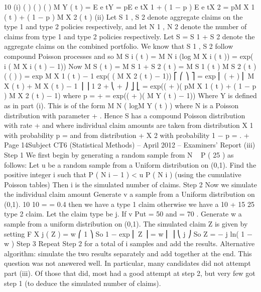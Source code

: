 \documentclass[a4paper,12pt]{article}
\begin{document}
10
(i)
( )
( )
( )
M Y ( t ) = E e tY = pE e tX 1 + ( 1 − p ) E e tX 2
= pM X 1 ( t ) + ( 1 − p ) M X 2 ( t )
(ii)
Let S 1 , S 2 denote aggregate claims on the type 1 and type 2 policies
respectively, and let N 1 , N 2 denote the number of claims from type 1 and type
2 policies respectively. Let S = S 1 + S 2 denote the aggregate claims on the
combined portfolio. We know that S 1 , S 2 follow compound Poisson processes
and so
M S i ( t ) = M N i (log M X i ( t )) = exp( \lambda  i ( M X i ( t ) − 1))
Now
M S ( t ) = M S 1 + S 2 ( t ) = M S 1 ( t ) M S 2 ( t )
( (
) )
= exp  M X 1 ( t ) − 1 exp(  ( M X 2 ( t ) − 1))
⎡
⎛ 
⎞ ⎤
= exp ⎢ (  +  ) ⎜
M X ( t ) +
M X ( t ) − 1 ⎟ ⎥
1
2
 + 
⎝  + 
⎠ ⎦
⎣
= exp((  +  )( pM X 1 ( t ) + ( 1 − p ) M X 2 ( t ) − 1) where p =
 + 
= exp((  +  )( M Y ( t ) − 1))
Where Y is defined as in part (i). This is of the form M N ( logM Y ( t ) ) where N
is a Poisson distribution with parameter  +  . Hence S has a compound
Poisson distribution with rate  +  and where individual claim amounts are
taken from distribution X 1 with probability p =
and from distribution
 + 
X 2 with probability 1 − p =
.
 + 
Page 14Subject CT6 (Statistical Methods) – April 2012 – Examiners’ Report
(iii)
Step 1
We first begin by generating a random sample from N ~ P ( 25 ) as follows:
Let u be a random sample from a Uniform distribution on (0,1).
Find the positive integer i such that P ( N \leq  i − 1 ) < u \leq  P ( N \leq  i ) (using the
cumulative Poisson tables)
Then i is the simulated number of claims.
Step 2
Now we simulate the individual claim amount
Generate v a sample from a Uniform distribution on (0,1).
10
10
=
= 0.4 then we have a type 1 claim otherwise we have a
10 + 15 25
type 2 claim. Let the claim type be j.
If v \leq 
Put  = 50 and  = 70 . Generate w a sample from a uniform distribution on
(0,1).
The simulated claim Z is given by setting
F X j ( Z ) = w
⎛ 1 ⎞
So 1 − exp ⎜
Z ⎟ = w
⎜ \mu 
⎟
⎝ j ⎠
So Z = − \mu  j ln( 1 − w )
Step 3
Repeat Step 2 for a total of i samples and add the results.
Alternative algorithm: simulate the two results separately and add together at
the end.
This question was not answered well. In particular, many candidates did not attempt part
(iii). Of those that did, most had a good attempt at step 2, but very few got step 1 (to deduce
the simulated number of claims).
\end{document}
